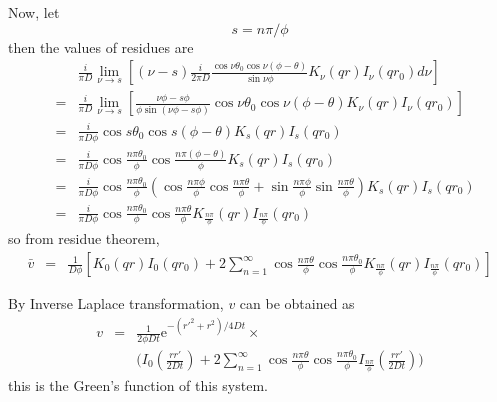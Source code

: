 \documentclass{article}
\begin{document}

Now, let
\begin{equation}
    s = n\pi / \phi
\end{equation}
then the values of residues are
\begin{eqnarray}
    & & \frac{i}{\pi D}\lim_{\nu\to s}\left[
        (\nu - s)\frac{i}{2\pi D}
                 \frac{\cos\nu\theta_0\cos\nu(\phi - \theta)}{\sin\nu\phi}
                 K_\nu(qr)I_\nu(qr_0)d\nu
        \right] \nonumber \\
    &=& \frac{i}{\pi D}\lim_{\nu\to s}\left[
        \frac{\nu\phi - s\phi}{\phi\sin(\nu\phi-s\phi)}
        \cos\nu\theta_0\cos\nu(\phi - \theta)
        K_\nu(qr)I_\nu(qr_0)
        \right] \nonumber \\
    &=& \frac{i}{\pi D\phi}\cos s\theta_0\cos s(\phi - \theta)K_s(qr)I_s(qr_0) \nonumber\\
    &=& \frac{i}{\pi D\phi}\cos\frac{n\pi\theta_0}{\phi}\cos\frac{n\pi(\phi - \theta)}{\phi}
        K_s(qr)I_s(qr_0) \nonumber\\
    &=& \frac{i}{\pi D\phi}\cos\frac{n\pi\theta_0}{\phi}
        (\cos\frac{n\pi\phi}{\phi}\cos\frac{n\pi\theta}{\phi} + \sin\frac{n\pi\phi}{\phi}\sin\frac{n\pi\theta}{\phi})
        K_s(qr)I_s(qr_0) \nonumber\\
    &=& \frac{i}{\pi D\phi}\cos\frac{n\pi\theta_0}{\phi}\cos\frac{n\pi\theta}{\phi}K_{\frac{n\pi}{\phi}}(qr)I_{\frac{n\pi}{\phi}}(qr_0) \nonumber
\end{eqnarray}
so from residue theorem,
\begin{eqnarray}
    \bar{v} &=& \frac{1}{D\phi}\left[K_0(qr)I_0(qr_0) + 
                2\sum^{\infty}_{n=1}
                \cos\frac{n\pi\theta}{\phi}\cos\frac{n\pi\theta_0}{\phi}
                K_{\frac{n\pi}{\phi}}(qr)I_{\frac{n\pi}{\phi}}(qr_0) \right]
\end{eqnarray}

By Inverse Laplace transformation, $v$ can be obtained as
\begin{eqnarray}
    v &=& \frac{1}{2\phi Dt}\mathrm{e}^{-(r'^2 + r^2)/4Dt} \times\nonumber \\
      & & \Biggl(I_0\left(\frac{rr'}{2Dt}\right) + 
          2\sum^{\infty}_{n=1}\cos\frac{n\pi\theta}{\phi}\cos\frac{n\pi\theta_0}{\phi}
          I_{\frac{n\pi}{\phi}}\left(\frac{rr'}{2Dt}\right) \Biggr)
\end{eqnarray}
this is the Green's function of this system.
\end{document}
